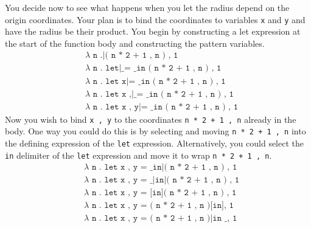 You decide now to see what happens when you let the
radius depend on the origin coordinates.
Your plan is to bind the coordinates to variables
\texttt{x} and \texttt{y} and have the radius be their product.
You begin by constructing a let expression at the start
of the function body and constructing the pattern variables.
\begin{align*}
  & \texttt{$\lambda$ n .|( n * 2 + 1 , n ) , 1} \\
  & \texttt{$\lambda$ n . let|\_ = \_ in ( n * 2 + 1 , n ) , 1} \\
  & \texttt{$\lambda$ n . let x|= \_ in ( n * 2 + 1 , n ) , 1} \\
  & \texttt{$\lambda$ n . let x ,|\_ = \_ in ( n * 2 + 1 , n ) , 1} \\
  & \texttt{$\lambda$ n . let x , y|= \_ in ( n * 2 + 1 , n ) , 1}
\end{align*}
Now you wish to bind \texttt{x , y} to the coordinates
\texttt{n * 2 + 1 , n} already in the body.
One way you could do this is by selecting and moving
\texttt{n * 2 + 1 , n} into the defining expression of
the \texttt{let} expression.
Alternatively, you could select the \texttt{in} delimiter
of the \texttt{let} expression and move it to wrap
\texttt{n * 2 + 1 , n}.
\begin{align*}
  & \texttt{$\lambda$ n . let x , y = \_ in|( n * 2 + 1 , n ) , 1} \\
  & \texttt{$\lambda$ n . let x , y = \_|in|( n * 2 + 1 , n ) , 1} \\
  & \texttt{$\lambda$ n . let x , y = [in]( n * 2 + 1 , n ) , 1} \\
  & \texttt{$\lambda$ n . let x , y = ( n * 2 + 1 , n )[in], 1} \\
  & \texttt{$\lambda$ n . let x , y = ( n * 2 + 1 , n )|in \_ , 1}
\end{align*}

